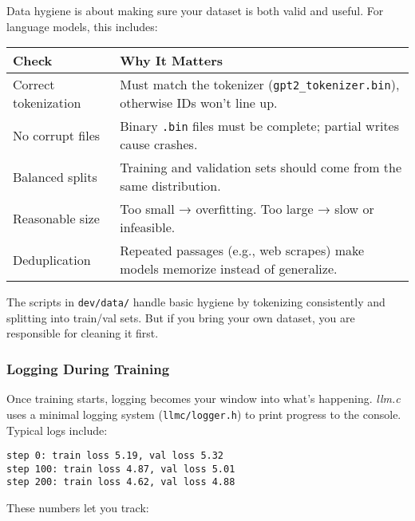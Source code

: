 \documentclass[
  letterpaper,
  DIV=11,
  numbers=noendperiod]{scrreprt}
\begin{document}
Data hygiene is about making sure your dataset is both valid and useful.
For language models, this includes:

\begin{longtable}[]{@{}
  >{\raggedright\arraybackslash}p{}
  >{\raggedright\arraybackslash}p{}@{}}
\toprule\noalign{}
\begin{minipage}[b]{\linewidth}\raggedright
Check
\end{minipage} & \begin{minipage}[b]{\linewidth}\raggedright
Why It Matters
\end{minipage} \\
\midrule\noalign{}
\endhead
\bottomrule\noalign{}
\endlastfoot
Correct tokenization & Must match the tokenizer
(\texttt{gpt2\_tokenizer.bin}), otherwise IDs won't line up. \\
No corrupt files & Binary \texttt{.bin} files must be complete; partial
writes cause crashes. \\
Balanced splits & Training and validation sets should come from the same
distribution. \\
Reasonable size & Too small → overfitting. Too large → slow or
infeasible. \\
Deduplication & Repeated passages (e.g., web scrapes) make models
memorize instead of generalize. \\
\end{longtable}

The scripts in \texttt{dev/data/} handle basic hygiene by tokenizing
consistently and splitting into train/val sets. But if you bring your
own dataset, you are responsible for cleaning it first.

\subsubsection{Logging During Training}\label{logging-during-training}

Once training starts, logging becomes your window into what's happening.
\emph{llm.c} uses a minimal logging system (\texttt{llmc/logger.h}) to
print progress to the console. Typical logs include:

\begin{verbatim}
step 0: train loss 5.19, val loss 5.32
step 100: train loss 4.87, val loss 5.01
step 200: train loss 4.62, val loss 4.88
\end{verbatim}

These numbers let you track:
\end{document}
